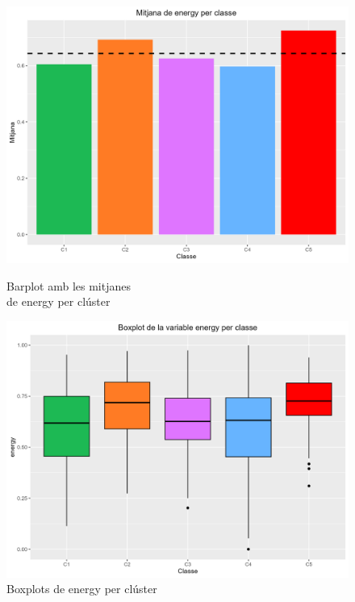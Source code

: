 \documentclass{article}
\begin{document}
\begin{figure}[H]
\centering
    \begin{minipage}{.49\textwidth}
        \centering
        \includegraphics[width=0.95\linewidth]{Images/5_Profiling/numeriques/Num_BarPlot_energy.png}
        \caption{Barplot amb les mitjanes \\ de energy per clúster}
        \label{fig:Num_BarPlot_streams}
    \end{minipage}%
    \begin{minipage}{.49\textwidth}
        \centering
        \includegraphics[width=0.95\linewidth]{Images/5_Profiling/numeriques/Num_BoxPlot_energy.png}
        \caption{Boxplots de energy per clúster}
        \label{fig:Num_BoxPlot_streams}
    \end{minipage}%
\end{figure}
\end{document}

